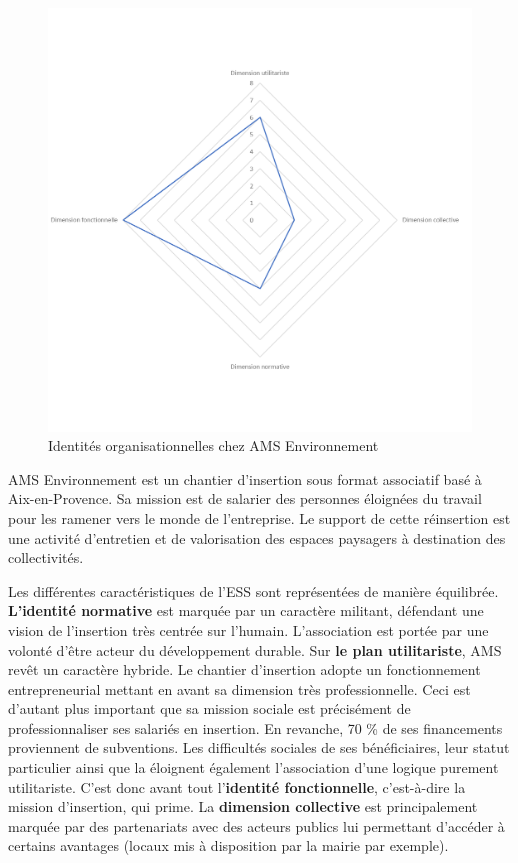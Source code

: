        \begin{figure}[h]
            \caption{Identités organisationnelles chez AMS Environnement}
            \label{figure:dimAMSenvir}
            \includegraphics[width=\linewidth]{fig/radars/AMS.png}
        \end{figure}

        AMS Environnement est un chantier d’insertion sous format associatif basé à Aix-en-Provence. Sa mission est de salarier des personnes éloignées du travail pour les ramener vers le monde de l’entreprise. Le support de cette réinsertion est une activité d’entretien et de valorisation des espaces paysagers à destination des collectivités.

        Les différentes caractéristiques de l’ESS sont représentées de manière équilibrée. \textbf{L'identité normative} est marquée par un caractère militant, défendant une vision de l’insertion très centrée sur l’humain. L’association est portée par une volonté d’être acteur du développement durable. Sur \textbf{le plan utilitariste}, AMS revêt un caractère hybride. Le chantier d’insertion adopte un fonctionnement entrepreneurial mettant en avant sa dimension très professionnelle. Ceci est d’autant plus important que sa mission sociale est précisément de professionnaliser ses salariés en insertion. En revanche, 70 \% de ses financements proviennent de subventions. Les difficultés sociales de ses bénéficiaires, leur statut particulier ainsi que la  éloignent également l’association d’une logique purement utilitariste. C'est donc avant tout l'\textbf{identité fonctionnelle}, c'est-à-dire la mission d'insertion, qui prime. La \textbf{dimension collective} est principalement marquée par des partenariats avec des acteurs publics lui permettant d’accéder à certains avantages (locaux mis à disposition par la mairie par exemple).  \\


